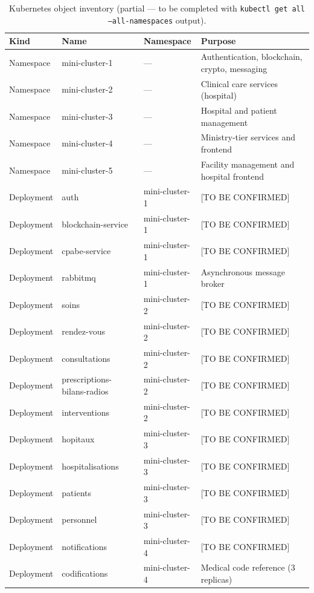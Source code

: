 \documentclass[12pt,a4paper]{report}
\begin{document}
\begin{table}[htbp]
\centering
\caption{Kubernetes object inventory (partial --- to be completed with
\texttt{kubectl get all --all-namespaces} output).}
\label{tab:k8s_objects}
\begin{tabular}{L{2cm} L{3.5cm} L{3cm} L{5cm}}
\toprule
\textbf{Kind} & \textbf{Name} & \textbf{Namespace} & \textbf{Purpose} \\
\midrule
Namespace & mini-cluster-1 & --- & Authentication, blockchain, crypto, messaging \\
Namespace & mini-cluster-2 & --- & Clinical care services (hospital) \\
Namespace & mini-cluster-3 & --- & Hospital and patient management \\
Namespace & mini-cluster-4 & --- & Ministry-tier services and frontend \\
Namespace & mini-cluster-5 & --- & Facility management and hospital frontend \\
Deployment & auth & mini-cluster-1 & [TO BE CONFIRMED] \\
Deployment & blockchain-service & mini-cluster-1 & [TO BE CONFIRMED] \\
Deployment & cpabe-service & mini-cluster-1 & [TO BE CONFIRMED] \\
Deployment & rabbitmq & mini-cluster-1 & Asynchronous message broker \\
Deployment & soins & mini-cluster-2 & [TO BE CONFIRMED] \\
Deployment & rendez-vous & mini-cluster-2 & [TO BE CONFIRMED] \\
Deployment & consultations & mini-cluster-2 & [TO BE CONFIRMED] \\
Deployment & prescriptions-bilans-radios & mini-cluster-2 & [TO BE CONFIRMED] \\
Deployment & interventions & mini-cluster-2 & [TO BE CONFIRMED] \\
Deployment & hopitaux & mini-cluster-3 & [TO BE CONFIRMED] \\
Deployment & hospitalisations & mini-cluster-3 & [TO BE CONFIRMED] \\
Deployment & patients & mini-cluster-3 & [TO BE CONFIRMED] \\
Deployment & personnel & mini-cluster-3 & [TO BE CONFIRMED] \\
Deployment & notifications & mini-cluster-4 & [TO BE CONFIRMED] \\
Deployment & codifications & mini-cluster-4 & Medical code reference (3 replicas) \\

\end{tabular}
\end{table}
\end{document}
